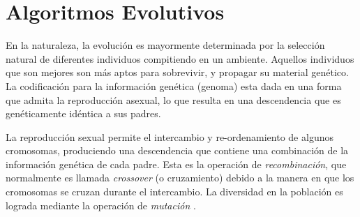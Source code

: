 \section{Algoritmos Evolutivos}
En la naturaleza, la evolución es mayormente determinada por la selección natural de diferentes individuos compitiendo en un ambiente. Aquellos individuos que son mejores son más aptos para sobrevivir, y propagar su material genético. La codificación para la información genética (genoma) esta dada en una forma que admita la reproducción asexual, lo que resulta en una descendencia que es genéticamente idéntica a sus padres.

La reproducción sexual permite el intercambio y re-ordenamiento de algunos cromosomas, produciendo una descendencia que contiene una combinación de la información genética de cada padre. Esta es la operación de \emph{recombinación}, que normalmente es llamada \emph{crossover} (o cruzamiento) debido a la manera en que los cromosomas se cruzan durante el intercambio. La diversidad en la población es lograda mediante la operación de \emph{mutación} \cite{grosan2011intelligent}.


